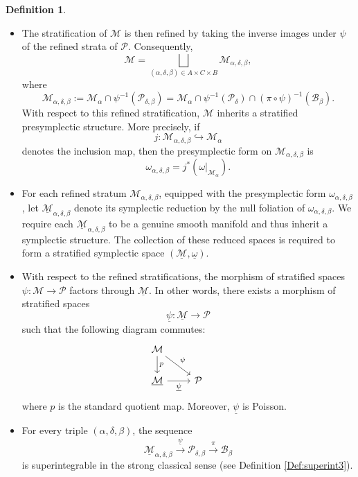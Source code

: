 \documentclass[12pt]{amsart}
\theoremstyle{definition}
\newtheorem{definition}[theorem]{Definition}
\numberwithin{equation}{section}
\begin{document}
\begin{definition}
\begin{itemize}
    \item[(6)~] The stratification of $\mathcal{M}$ is then refined by taking the inverse images under $\psi$ of the refined strata of $\mathcal{P}$. Consequently,
    \[
        \mathcal{M}
        = \bigsqcup_{(\alpha,\delta,\beta)\in A\times C\times B}
        \mathcal{M}_{\alpha,\delta,\beta},
    \]
    where
    \[
        \mathcal{M}_{\alpha,\delta,\beta}
        := \mathcal{M}_{\alpha}\cap\psi^{-1}(\mathcal{P}_{\delta,\beta})
        = \mathcal{M}_{\alpha}\cap\psi^{-1}(\mathcal{P}_{\delta})
        \cap(\pi\circ\psi)^{-1}(\mathcal{B}_{\beta}).
    \]
     With respect to this refined stratification, $\mathcal{M}$ inherits a stratified presymplectic structure. More precisely, if
    \[
        j:\mathcal{M}_{\alpha,\delta,\beta}\hookrightarrow\mathcal{M}_{\alpha}
    \]
    denotes the inclusion map, then the presymplectic form on $\mathcal{M}_{\alpha,\delta,\beta}$ is
    \[
       \omega_{\alpha,\delta,\beta}
       =j^*(\omega|_{\mathcal{M}_{\alpha}}).
    \]

    \item[(7)~] For each refined stratum $\mathcal{M}_{\alpha,\delta,\beta}$, equipped with the presymplectic form $\omega_{\alpha,\delta,\beta}$, let $\underline{\mathcal{M}}_{\alpha,\delta,\beta}$ denote its symplectic reduction by the null foliation of $\omega_{\alpha,\delta,\beta}$. We require each $\underline{\mathcal{M}}_{\alpha,\delta,\beta}$ to be a genuine smooth manifold and   thus inherit  a symplectic structure. The collection of these reduced spaces is required to form a stratified symplectic space $(\underline{\mathcal{M}},\underline{\omega})$.

    \item[(8)~] With respect to the refined stratifications, the morphism of stratified spaces $\psi:\mathcal{M}\to\mathcal{P}$ factors through $\underline{\mathcal{M}}$. In other words, there exists a morphism of stratified spaces
    \[
        \underline{\psi}:\underline{\mathcal{M}}\to\mathcal{P}
    \]
    such that the following diagram commutes:
    \begin{equation*}
    \begin{tikzcd}
        \mathcal{M} \arrow[dr,"\psi"] \arrow[d,"p"] & & \\
        \underline{\mathcal{M}} \arrow[r,"\underline{\psi}"'] & \mathcal{P}
    \end{tikzcd}
    \end{equation*}
    where $p$ is the standard quotient map. Moreover, $\underline{\psi}$ is Poisson.

    \item[(9)~] For every triple $(\alpha,\delta,\beta)$, the sequence
    \begin{equation}\label{Eqt:subsuperintsequence}
        \underline{\mathcal{M}}_{\alpha,\delta,\beta}
        \overset{\underline{\psi}}{\longrightarrow}
        \mathcal{P}_{\delta,\beta}
        \overset{\pi}{\longrightarrow}
        \mathcal{B}_{\beta}
    \end{equation}
    is superintegrable in the strong classical sense (see Definition \ref{Def:superint3}).
\end{itemize}
     \end{definition}
\end{document}
